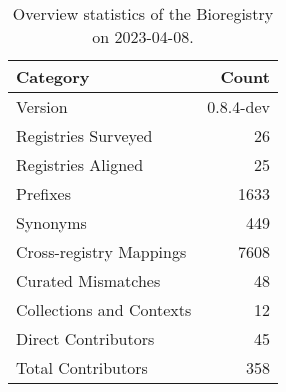 \begin{table}
\caption{Overview statistics of the Bioregistry on 2023-04-08.}
\label{tab:bioregistry-summary}
\begin{tabular}{lr}
\toprule
Category & Count \\
\midrule
Version & 0.8.4-dev \\
Registries Surveyed & 26 \\
Registries Aligned & 25 \\
Prefixes & 1633 \\
Synonyms & 449 \\
Cross-registry Mappings & 7608 \\
Curated Mismatches & 48 \\
Collections and Contexts & 12 \\
Direct Contributors & 45 \\
Total Contributors & 358 \\
\bottomrule
\end{tabular}
\end{table}
